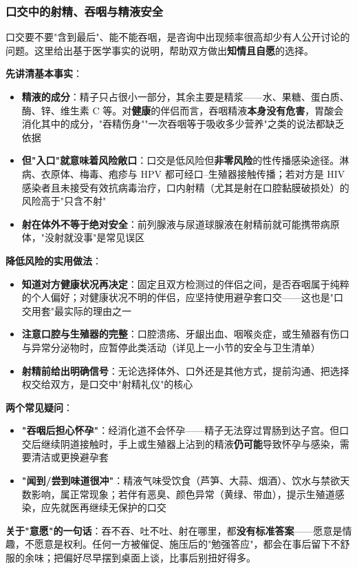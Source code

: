 \subsubsection{口交中的射精、吞咽与精液安全}

口交要不要"含到最后"、能不能吞咽，是咨询中出现频率很高却少有人公开讨论的问题。这里给出基于医学事实的说明，帮助双方做出\textbf{知情且自愿}的选择。

\vspace{0.5em}
\noindent\textbf{先讲清基本事实}：

\begin{itemize}
	\item \textbf{精液的成分}：精子只占很小一部分，其余主要是精浆——水、果糖、蛋白质、酶、锌、维生素 C 等。对\textbf{健康}的伴侣而言，吞咽精液\textbf{本身没有危害}，胃酸会消化其中的成分，"吞精伤身""一次吞咽等于吸收多少营养"之类的说法都缺乏依据
	\item \textbf{但"入口"就意味着风险敞口}：口交是低风险但\textbf{非零风险}的性传播感染途径。淋病、衣原体、梅毒、疱疹与 HPV 都可经口--生殖器接触传播；若对方是 HIV 感染者且未接受有效抗病毒治疗，口内射精（尤其是射在口腔黏膜破损处）的风险高于"只含不射"
	\item \textbf{射在体外不等于绝对安全}：前列腺液与尿道球腺液在射精前就可能携带病原体，"没射就没事"是常见误区
\end{itemize}

\vspace{0.5em}
\noindent\textbf{降低风险的实用做法}：

\begin{itemize}
	\item \textbf{知道对方健康状况再决定}：固定且双方检测过的伴侣之间，是否吞咽属于纯粹的个人偏好；对健康状况不明的伴侣，应坚持使用避孕套口交——这也是"口交用套"最实际的理由之一
	\item \textbf{注意口腔与生殖器的完整}：口腔溃疡、牙龈出血、咽喉炎症，或生殖器有伤口与异常分泌物时，应暂停此类活动（详见上一小节的安全与卫生清单）
	\item \textbf{射精前给出明确信号}：无论选择体外、口外还是其他方式，提前沟通、把选择权交给双方，是口交中"射精礼仪"的核心
\end{itemize}

\vspace{0.5em}
\noindent\textbf{两个常见疑问}：

\begin{itemize}
	\item \textbf{"吞咽后担心怀孕"}：经消化道不会怀孕——精子无法穿过胃肠到达子宫。但口交后继续阴道接触时，手上或生殖器上沾到的精液\textbf{仍可能}导致怀孕与感染，需要清洁或更换避孕套
	\item \textbf{"闻到/尝到味道很冲"}：精液气味受饮食（芦笋、大蒜、烟酒）、饮水与禁欲天数影响，属正常现象；若伴有恶臭、颜色异常（黄绿、带血），提示生殖道感染，应先就医再继续无保护的口交
\end{itemize}

\vspace{0.5em}
\noindent\textbf{关于"意愿"的一句话}：吞不吞、吐不吐、射在哪里，都\textbf{没有标准答案}——愿意是情趣，不愿意是权利。任何一方被催促、施压后的"勉强答应"，都会在事后留下不舒服的余味；把偏好尽早摆到桌面上谈，比事后别扭好得多。

